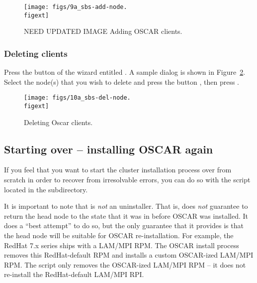 \begin{figure}[htbp]
  \begin{center}
    \texttt{[image: figs/9a\_sbs-add-node.\\figext]}
    \caption{NEED UPDATED IMAGE Adding OSCAR clients.}
    \label{fig:detailed-add-node}
  \end{center}
\end{figure}


\subsubsection{Deleting clients}

Press the button of the wizard entitled .
A sample dialog is shown in Figure~\ref{fig:detailed-delete-node}.
Select the node(s) that you wish to delete and press the button
, then press .

\begin{figure}[htbp]
  \begin{center}
    \texttt{[image: figs/10a\_sbs-del-node.\\figext]}
    \caption{Deleting Oscar clients.}
    \label{fig:detailed-delete-node}
  \end{center}
\end{figure}


\subsection{Starting over -- installing OSCAR again}

If you feel that you want to start the cluster installation process
over from scratch in order to recover from irresolvable errors, you
can do so with the  script located in the
 subdirectory.

It is important to note that  is {\em not} an
uninstaller.  That is,  does {\em not} guarantee to
return the head node to the state that it was in before OSCAR was
installed.  It does a ``best attempt'' to do so, but the only
guarantee that it provides is that the head node will be suitable for
OSCAR re-installation.  For example, the RedHat 7.x series ships with
a LAM/MPI RPM.  The OSCAR install process removes this RedHat-default
RPM and installs a custom OSCAR-ized LAM/MPI RPM.  The
 script only removes the OSCAR-ized LAM/MPI RPM -- it
does not re-install the RedHat-default LAM/MPI RPI.

